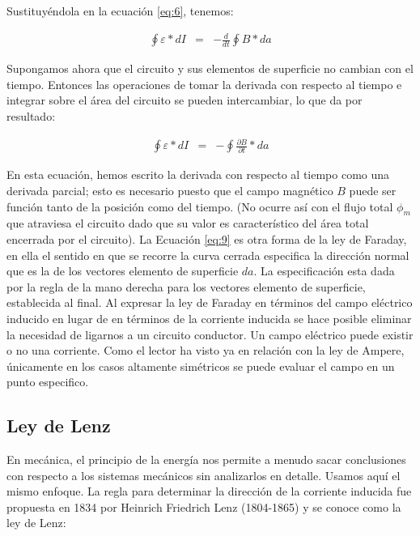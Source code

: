 \documentclass[11pt]{article}
\begin{document}
\begin{multicols}{2}
		Sustituyéndola en la ecuación \ref{eq:6}, tenemos:

		\begin{eqnarray}
			\oint \varepsilon * dI &=& -\frac{d}{dt}\oint B*da\label{eq:8}
		\end{eqnarray}

		Supongamos ahora que el circuito y sus elementos de superficie no cambian con el tiempo. Entonces las operaciones de tomar la derivada con respecto al tiempo e integrar sobre el área del circuito se pueden intercambiar, lo que da por resultado:

		\begin{eqnarray}
			\oint \varepsilon * dI &=& -\oint \frac{\partial B}{\partial t}*da\label{eq:9}
		\end{eqnarray}

		En esta ecuación, hemos escrito la derivada con respecto al tiempo como una derivada parcial; esto es necesario puesto que el campo magnético $B$ puede ser función tanto de la posición como del tiempo. (No ocurre así con el flujo total $\phi_m$ que atraviesa el circuito dado que su valor es característico del área total encerrada por el circuito). La Ecuación \ref{eq:9} es otra forma de la ley de Faraday, en ella el sentido en que se recorre la curva cerrada especifica la dirección normal que es la de los vectores elemento de superficie $da$. La especificación esta dada por la regla de la mano derecha para los vectores elemento de superficie, establecida al final.
		Al expresar la ley de Faraday en términos del campo eléctrico inducido en lugar de en términos de la corriente inducida se hace posible eliminar la necesidad de ligarnos a un circuito conductor. Un campo eléctrico puede existir o no una corriente. Como el lector ha visto ya en relación con la ley de Ampere, únicamente en los casos altamente simétricos se puede evaluar el campo en un punto especifico.


	\subsection{Ley de Lenz}


		En mecánica, el principio de la energía nos permite a menudo sacar conclusiones con respecto a los sistemas mecánicos sin analizarlos en detalle. Usamos aquí el mismo enfoque. La regla para determinar la dirección de la corriente inducida fue propuesta en 1834 por Heinrich Friedrich Lenz (1804-1865) y se conoce como la ley de Lenz:
		\vspace{5mm}


\end{multicols}
\end{document}
